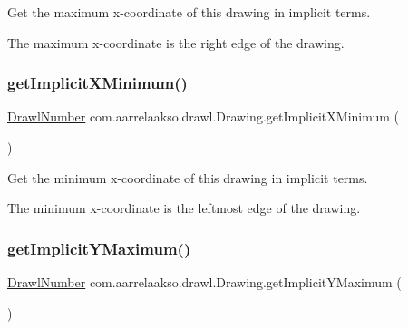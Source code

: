 Get the maximum x-\/coordinate of this drawing in implicit terms. 

The maximum x-\/coordinate is the right edge of the drawing. \mbox{\label{classcom_1_1aarrelaakso_1_1drawl_1_1_drawing_ac2caf8d67e6336d7d64f63711e149640}} 
\subsubsection{\texorpdfstring{get\+Implicit\+X\+Minimum()}{getImplicitXMinimum()}}
{\footnotesize\ttfamily \hyperlink{classcom_1_1aarrelaakso_1_1drawl_1_1_drawl_number}{Drawl\+Number} com.\+aarrelaakso.\+drawl.\+Drawing.\+get\+Implicit\+X\+Minimum (\begin{DoxyParamCaption}{ }\end{DoxyParamCaption})\hspace{0.3cm}{\ttfamily [private]}}



Get the minimum x-\/coordinate of this drawing in implicit terms. 

The minimum x-\/coordinate is the leftmost edge of the drawing. \mbox{\label{classcom_1_1aarrelaakso_1_1drawl_1_1_drawing_a98c65cfbe0cf261c4dfd516bfcf77328}} 
\subsubsection{\texorpdfstring{get\+Implicit\+Y\+Maximum()}{getImplicitYMaximum()}}
{\footnotesize\ttfamily \hyperlink{classcom_1_1aarrelaakso_1_1drawl_1_1_drawl_number}{Drawl\+Number} com.\+aarrelaakso.\+drawl.\+Drawing.\+get\+Implicit\+Y\+Maximum (\begin{DoxyParamCaption}{ }\end{DoxyParamCaption})\hspace{0.3cm}{\ttfamily [private]}}



